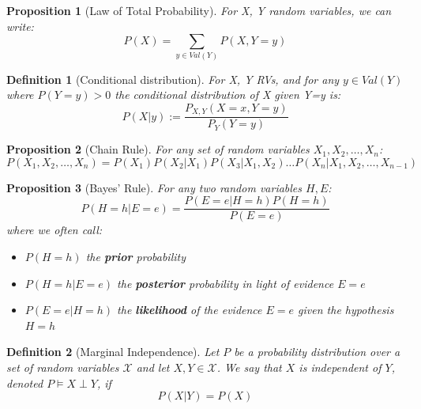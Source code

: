 \documentclass[11pt]{article}
\numberwithin{equation}{section}
\theoremstyle{boldStyle}
\theoremstyle{boldBlueStyle}
\newtheorem{proposition}{Proposition}[section]
\theoremstyle{boldPurpleStyle}
\theoremstyle{boldRedStyle}
\newtheorem{definition}{Definition}[section]
\begin{document}
\begin{proposition}[Law of Total Probability]
    For X, Y random variables, we can write:
    \begin{equation*}
        P(X) = \sum_{y \in Val(Y)} P(X, Y = y) 
    \end{equation*}
\end{proposition}

\begin{definition}[Conditional distribution]
    For X, Y RVs, and for any $y \in Val(Y)$ where $P(Y = y) > 0$ the conditional distribution of X given Y=y is:
    \begin{equation*}
        P(X| y) := \frac{P_{X,Y}(X = x, Y = y)}{P_Y(Y = y)}
    \end{equation*}
\end{definition}

\begin{proposition}[Chain Rule]
    For any set of random variables $X_1, X_2, \ldots, X_n$:
    \begin{equation*}
        P(X_1, X_2, \ldots, X_n) = P(X_1)P(X_2 | X_1)P(X_3 | X_1, X_2) \ldots P(X_n | X_1, X_2, \ldots, X_{n-1})
    \end{equation*}
\end{proposition}

\begin{proposition}[Bayes' Rule]
    For any two random variables $H, E$:
    \begin{equation*}
       P(H = h | E = e) = \frac{P(E = e | H = h)P(H = h)}{P(E = e)}
    \end{equation*}
    where we often call:
    \begin{itemize}
        \item $P(H = h)$ the \textbf{prior} probability
        \item $P(H = h | E = e)$ the \textbf{posterior} probability in light of evidence $E = e$
        \item $P(E = e | H = h)$ the \textbf{likelihood} of the evidence $E = e$ given the hypothesis $H = h$
    \end{itemize}
\end{proposition}

\begin{definition}[Marginal Independence]
    Let $P$ be a probability distribution over a set of random variables $\mathcal{X}$ and let $X, Y \in \mathcal{X}$.
    We say that $X$ is independent of $Y$, denoted $P \models X \perp Y$, if
    \begin{equation*}
        P(X | Y) = P(X)
    \end{equation*}
\end{definition}
\end{document}
